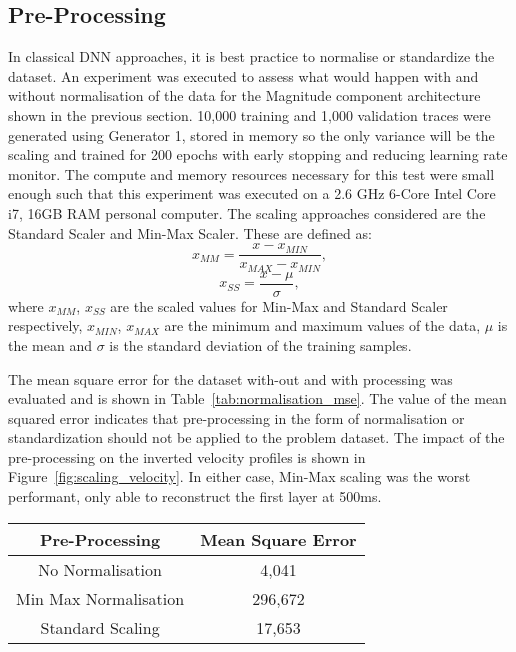 \subsection{Pre-Processing}\label{sec:results_Normalisation}
In classical DNN approaches, it is best practice to normalise or standardize the dataset. An experiment was executed to assess what would happen with and without normalisation of the data for the Magnitude component architecture shown in the previous section. 10,000 training and 1,000 validation traces were generated using Generator 1, stored in memory so the only variance will be the scaling and trained for 200 epochs with early stopping and reducing learning rate monitor. The compute and memory resources necessary for this test were small enough such that this experiment was executed on a 2.6 GHz 6-Core Intel Core i7, 16GB RAM personal computer. The scaling approaches considered are the Standard Scaler and Min-Max Scaler. These are defined as:
\begin{equation}
    x_{MM} = \frac{x-x_{MIN}}{x_{MAX}-x_{MIN}}, 
\end{equation}
\begin{equation}
    x_{SS} = \frac{x-\mu}{\sigma},
\end{equation}
where $x_{MM}$, $x_{SS}$ are the scaled values for Min-Max and Standard Scaler respectively, $x_{MIN}$, $x_{MAX}$ are the minimum and maximum values of the data, $\mu$ is the mean and $\sigma$ is the standard deviation of the training samples.

The mean square error for the dataset with-out and with processing was evaluated and is shown in Table~\ref{tab:normalisation_mse}. The value of the mean squared error indicates that pre-processing in the form of normalisation or standardization should not be applied to the problem dataset. The impact of the pre-processing on the inverted velocity profiles is shown in Figure~\ref{fig:scaling_velocity}. In either case, Min-Max scaling was the worst performant, only able to reconstruct the first layer at 500\si{ms}.

\begin{table*}[ht!]
    \footnotesize
    \centering
    \begin{tabular}{@{}cc@{}}\toprule
Pre-Processing & Mean Square Error \\ \hline
No Normalisation          & 4,041 \\
Min Max Normalisation     & 296,672 \\
Standard Scaling          & 17,653 \\\hline
\end{tabular}
\caption{Quantitative assessment on the impact of pre-precessing}\label{tab:normalisation_mse}
\end{table*} 

